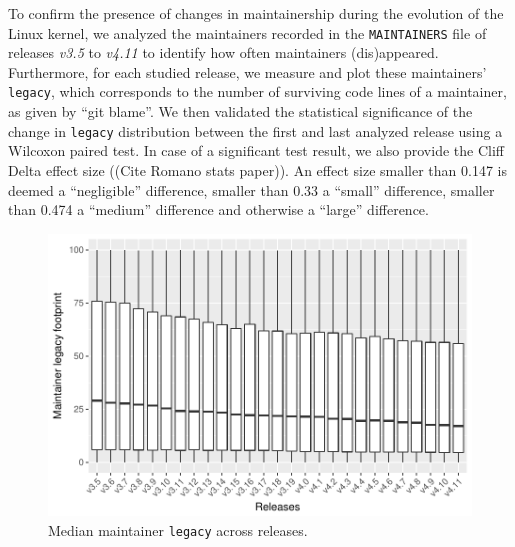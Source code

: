 To confirm the presence of changes in maintainership during the evolution of the Linux kernel, we analyzed the maintainers recorded in the \texttt{MAINTAINERS} file of releases \textit{v3.5} to \textit{v4.11} to identify how often maintainers (dis)appeared. %
Furthermore, for each studied release, we measure and plot these maintainers' \texttt{legacy}, which corresponds to the number of surviving code lines of a maintainer, as given by ``git blame''. %
We then validated the statistical significance of the change in \texttt{legacy} distribution between the first and last analyzed release using a Wilcoxon paired test. %
In case of a significant test result, we also provide the Cliff Delta effect size ((Cite Romano stats paper)). An effect size smaller than 0.147 is deemed a ``negligible'' difference, smaller than 0.33 a ``small'' difference, smaller than 0.474 a ``medium'' difference and otherwise a ``large'' difference.


\begin{figure}[t]
  \centering
  \includegraphics[scale=.6]{plots/RQ1_median_LOC}
  \caption{Median maintainer \texttt{legacy} across releases.}
  \label{fig:RQ1_temp}
\end{figure}

